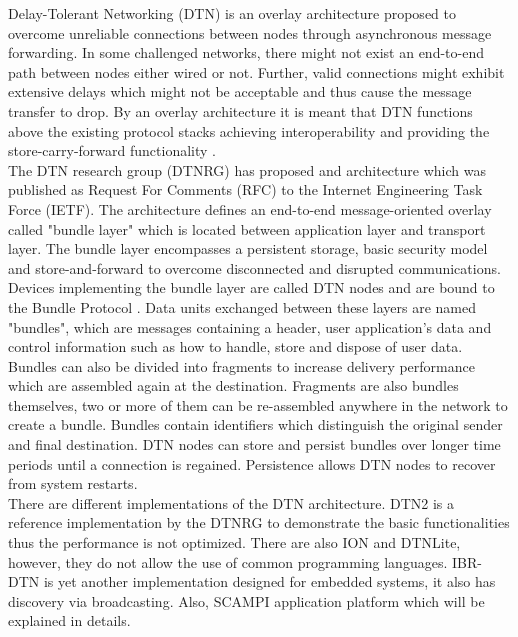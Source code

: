 Delay-Tolerant Networking (DTN) is an overlay architecture proposed to overcome unreliable connections between nodes through asynchronous message forwarding. In some challenged networks, there might not exist an end-to-end path between nodes either wired or not. Further, valid connections might exhibit extensive delays which might not be acceptable and thus cause the message transfer to drop. By an overlay architecture it is meant that DTN functions above the existing protocol stacks achieving interoperability and providing the store-carry-forward functionality \cite{Fall:2003:DNA:863955.863960}.\\

\noindent The DTN research group (DTNRG) has proposed and architecture which was published as Request For Comments (RFC) to the Internet Engineering Task Force (IETF). The architecture defines an end-to-end message-oriented overlay called "bundle layer" which is located  between  application layer and  transport layer. The bundle layer encompasses a persistent storage, basic security model and store-and-forward to overcome disconnected and disrupted communications. Devices implementing the bundle layer are called DTN nodes and are bound to the Bundle Protocol \cite{scott2007bundle}. Data units exchanged between these layers are named "bundles",  which are messages containing a header, user application's data and control information such as how to handle, store and dispose of user data. Bundles can also be divided into fragments  to increase delivery performance which are assembled again at the destination. Fragments are also bundles themselves, two or more of them can be re-assembled anywhere in the network to create a bundle. Bundles contain identifiers which distinguish the original sender and final destination. DTN nodes can store and persist bundles over longer time periods until a connection is regained.  Persistence allows DTN nodes to recover from system restarts\cite{fall2007delay}.\\


\noindent There are different implementations of the DTN architecture. DTN2 is a reference implementation by the DTNRG to demonstrate the basic functionalities thus the performance is not optimized. There are also ION and DTNLite, however, they do not allow the use of common programming languages. IBR-DTN is yet another implementation designed for embedded systems, it also has discovery via broadcasting\cite{Doering:2008:IEI:1409985.1410008}. Also, SCAMPI application platform which will be explained in details.




